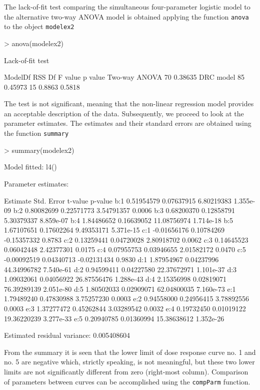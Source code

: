 \documentclass[a4paper]{article}
\begin{document}
The lack-of-fit test comparing the simultaneous four-parameter logistic model to the alternative two-way ANOVA model is obtained applying the
function \verb+anova+ to the object \verb+modelex2+

\begin{Schunk}
\begin{Sinput}
> anova(modelex2)
\end{Sinput}
\begin{Soutput}
Lack-of-fit test

              ModelDf     RSS Df F value p value
Two-way ANOVA      70 0.38635                   
DRC model          85 0.45973 15  0.8863  0.5818
\end{Soutput}
\end{Schunk}
The test is not significant, meaning that the non-linear regression model provides an acceptable description of the data.
Subsequently, we proceed to look at the parameter estimates. The estimates and their standard errors are obtained using the function \verb+summary+

\begin{Schunk}
\begin{Sinput}
> summary(modelex2)
\end{Sinput}
\begin{Soutput}
Model fitted: l4()

Parameter estimates:

       Estimate  Std. Error     t-value   p-value
b:1  0.51954579  0.07637915  6.80219383 1.355e-09
b:2  0.80082699  0.22571773  3.54791357    0.0006
b:3  0.68200370  0.12858791  5.30379337 8.859e-07
b:4  1.84486652  0.16639052 11.08756974 1.714e-18
b:5  1.67107651  0.17602264  9.49353171 5.371e-15
c:1 -0.01656176  0.10784269 -0.15357332    0.8783
c:2  0.13259441  0.04720028  2.80918702    0.0062
c:3  0.14645523  0.06042448  2.42377301    0.0175
c:4  0.07955753  0.03946655  2.01582172    0.0470
c:5 -0.00092519  0.04340713 -0.02131434    0.9830
d:1  1.87954967  0.04237996 44.34996782 7.540e-61
d:2  0.94599411  0.04227580 22.37672971 1.101e-37
d:3  1.09032061  0.04056922 26.87556476 1.288e-43
d:4  2.15356998  0.02819071 76.39289139 2.051e-80
d:5  1.80502033  0.02909071 62.04800035 7.160e-73
e:1  1.79489240  0.47830988  3.75257230    0.0003
e:2  0.94558000  0.24956415  3.78892556    0.0003
e:3  1.37277472  0.45262844  3.03289542    0.0032
e:4  0.19732450  0.01019122 19.36220239 3.277e-33
e:5  0.20940785  0.01360994 15.38638612 1.352e-26

Estimated residual variance: 0.005408604 
\end{Soutput}
\end{Schunk}
From the summary it is seen that the lower limit of dose response curve no. 1 and no. 5 are negative which, strictly speaking, is not meaningful,
but these two lower limits are not significantly different from zero (right-most column). Comparison of parameters between curves can
be accomplished using the \verb+compParm+ function.
\end{document}
